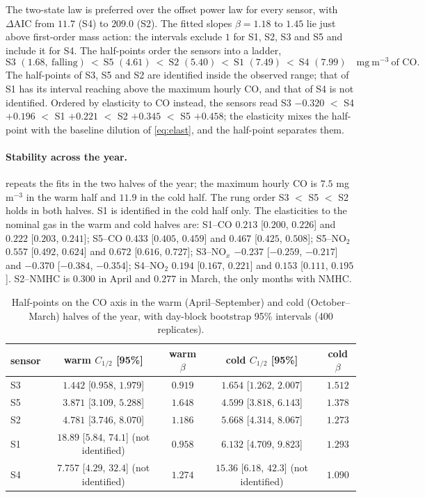 \documentclass[11pt]{article}
\theoremstyle{definition}\newtheorem{definition}[theorem]{Definition}
\theoremstyle{remark}\newtheorem{remark}[theorem]{Remark}
\begin{document}
The two-state law is preferred over the offset power law for every sensor, with $\Delta\mathrm{AIC}$ from $11.7$ (S4) to $209.0$ (S2). The fitted slopes $\beta=1.18$ to $1.45$ lie just above first-order mass action: the intervals exclude $1$ for S1, S2, S3 and S5 and include it for S4. The half-points order the sensors into a ladder,
\[
\text{S3 }(1.68,\ \text{falling})\ <\ \text{S5 }(4.61)\ <\ \text{S2 }(5.40)\ <\ \text{S1 }(7.49)\ <\ \text{S4 }(7.99)\quad\mathrm{mg\ m^{-3}}\ \text{of CO}.
\]
The half-points of S3, S5 and S2 are identified inside the observed range; that of S1 has its interval reaching above the maximum hourly CO, and that of S4 is not identified. Ordered by elasticity to CO instead, the sensors read S3 $-0.320$ $<$ S4 $+0.196$ $<$ S1 $+0.221$ $<$ S2 $+0.345$ $<$ S5 $+0.458$; the elasticity mixes the half-point with the baseline dilution of \eqref{eq:elast}, and the half-point separates them.

\paragraph{Stability across the year.}  repeats the fits in the two halves of the year; the maximum hourly CO is $7.5$ mg\,m$^{-3}$ in the warm half and $11.9$ in the cold half. The rung order S3 $<$ S5 $<$ S2 holds in both halves. S1 is identified in the cold half only. The elasticities to the nominal gas in the warm and cold halves are: S1--CO $0.213$ [$0.200$, $0.226$] and $0.222$ [$0.203$, $0.241$]; S5--CO $0.433$ [$0.405$, $0.459$] and $0.467$ [$0.425$, $0.508$]; S5--NO$_2$ $0.557$ [$0.492$, $0.624$] and $0.672$ [$0.616$, $0.727$]; S3--NO$_x$ $-0.237$ [$-0.259$, $-0.217$] and $-0.370$ [$-0.384$, $-0.354$]; S4--NO$_2$ $0.194$ [$0.167$, $0.221$] and $0.153$ [$0.111$, $0.195$]. S2--NMHC is $0.300$ in April and $0.277$ in March, the only months with NMHC.

\begin{table}[htbp]\centering
\caption{Half-points on the CO axis in the warm (April--September) and cold (October--March) halves of the year, with day-block bootstrap 95\% intervals (400 replicates).}\label{tab:season}
\small
\begin{tabular}{@{}lcccc@{}}\toprule
sensor & warm $C_{1/2}$ [95\%] & warm $\beta$ & cold $C_{1/2}$ [95\%] & cold $\beta$\\\midrule
S3 & $1.442$ [$0.958$, $1.979$] & $0.919$ & $1.654$ [$1.262$, $2.007$] & $1.512$\\
S5 & $3.871$ [$3.109$, $5.288$] & $1.648$ & $4.599$ [$3.818$, $6.143$] & $1.378$\\
S2 & $4.781$ [$3.746$, $8.070$] & $1.186$ & $5.668$ [$4.314$, $8.067$] & $1.273$\\
S1 & $18.89$ [$5.84$, $74.1$] (not identified) & $0.958$ & $6.132$ [$4.709$, $9.823$] & $1.293$\\
S4 & $7.757$ [$4.29$, $32.4$] (not identified) & $1.274$ & $15.36$ [$6.18$, $42.3$] (not identified) & $1.090$\\\bottomrule
\end{tabular}
\end{table}
\end{document}
